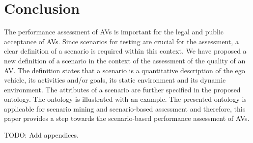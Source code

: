 \section{Conclusion}
\label{sec:conclusion}

The performance assessment of AVs is important for the legal and public acceptance of AVs. 
Since scenarios for testing are crucial for the assessment, a clear definition of a scenario is required within this context. 
We have proposed a new definition of a scenario in the context of the assessment of the quality of an AV. 
The definition states that a scenario is a quantitative description of the ego vehicle, its activities and/or goals, its static environment and its dynamic environment. 
The attributes of a scenario are further specified in the proposed ontology.
The ontology is illustrated with an example.
The presented ontology is applicable for scenario mining and scenario-based assessment and therefore, this paper provides a step towards the scenario-based performance assessment of AVs. 

\color{red}
TODO: Add appendices.
\color{black}
